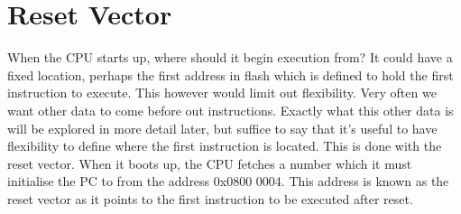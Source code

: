 \section{Reset Vector}
When the CPU starts up, where should it begin execution from? It could have a fixed location, perhaps the first address in flash which is defined to hold the first instruction to execute. This however would limit out flexibility. Very often we want other data to come before out instructions. Exactly what this other data is will be explored in more detail later, but suffice to say that it's useful to have flexibility to define where the first instruction is located. This is done with the reset vector. When it boots up, the CPU fetches a number which it must initialise the PC to from the address 0x0800 0004. This address is known as the reset vector as it points to the first instruction to be executed after reset.
